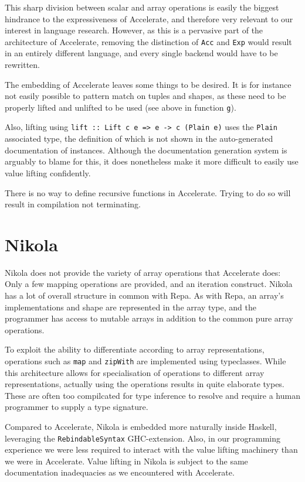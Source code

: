 This sharp division between scalar and array operations is easily the biggest
hindrance to the expressiveness of Accelerate, and therefore very relevant to
our interest in language research. However, as this is a pervasive part of the
architecture of Accelerate, removing the distinction of \texttt{Acc} and
\texttt{Exp} would result in an entirely different language, and every single
backend would have to be rewritten.

The embedding of Accelerate leaves some things to be desired. It is for
instance not easily possible to pattern match on tuples and shapes, as these
need to be properly lifted and unlifted to be used (see above in function \texttt{g}).

Also, lifting using \texttt{lift :: Lift c e => e -> c (Plain e)} uses the
\texttt{Plain} associated type, the definition of which is not shown in the
auto-generated documentation of instances. Although the documentation
generation system is arguably to blame for this, it does nonetheless make it
more difficult to easily use value lifting confidently.

There is no way to define recursive functions in Accelerate. Trying to do so
will result in compilation not terminating.

\section{Nikola}
\label{sec:language-discussion-nikola}

Nikola does not provide the variety of array operations that Accelerate does: Only
a few mapping operations are provided, and an iteration construct.  Nikola has
a lot of overall structure in common with Repa. As with Repa, an array's
implementations and shape are represented in the array type, and the programmer
has access to mutable arrays in addition to the common pure array operations.

To exploit the ability to differentiate according to array representations,
operations such as \texttt{map} and \texttt{zipWith} are implemented using
typeclasses.  While this architecture allows for specialisation of operations
to different array representations, actually using the operations results in quite
elaborate types. These are often too compilcated for type inference to resolve
and require a human programmer to supply a type signature.

Compared to Accelerate, Nikola is embedded more naturally inside Haskell,
leveraging the \texttt{RebindableSyntax} GHC-extension. Also, in our programming
experience we were less required to interact with the value lifting machinery
than we were in Accelerate. Value lifting in Nikola is subject to the same
documentation inadequacies as we encountered with Accelerate.

